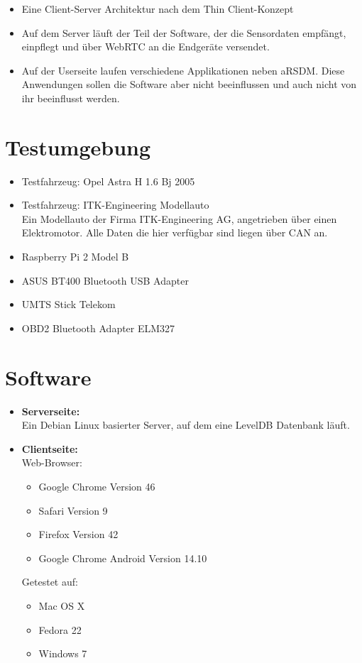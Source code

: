 \documentclass[pflichtenheft.tex]{subfiles}
\begin{document}
\begin{itemize}

\item
Eine Client-Server Architektur nach dem Thin Client-Konzept
\item
Auf dem Server läuft der Teil der Software, der die Sensordaten empfängt, einpflegt und über WebRTC an die Endgeräte versendet.
\item
Auf der Userseite laufen verschiedene Applikationen neben aRSDM. Diese Anwendungen sollen die Software aber nicht beeinflussen und auch nicht von ihr beeinflusst werden.
\end{itemize}

\section*{Testumgebung}
\begin{itemize}
\item
Testfahrzeug: Opel Astra H 1.6 Bj 2005 %
\item
Testfahrzeug: ITK-Engineering Modellauto \\
Ein Modellauto der Firma ITK-Engineering AG, angetrieben über einen Elektromotor. Alle Daten die hier verfügbar sind liegen über CAN an.
\item
Raspberry Pi 2 Model B
\item
ASUS BT400 Bluetooth USB Adapter
\item
UMTS Stick Telekom
\item
OBD2 Bluetooth Adapter ELM327

\end{itemize}


\section{Software}
\begin{itemize}
\item
\textbf{Serverseite:}\\
Ein Debian Linux basierter Server, auf dem eine LevelDB Datenbank läuft.
\item
\textbf{Clientseite:}\\
Web-Browser:
\begin{itemize}
\item
Google Chrome Version 46
\item
Safari Version 9
\item
Firefox Version 42
\item
Google Chrome Android Version 14.10
\end{itemize}
Getestet auf:
\begin{itemize}
\item
Mac OS X
\item
Fedora 22
\item
Windows 7
\end{itemize}
\end{itemize}
\end{document}

